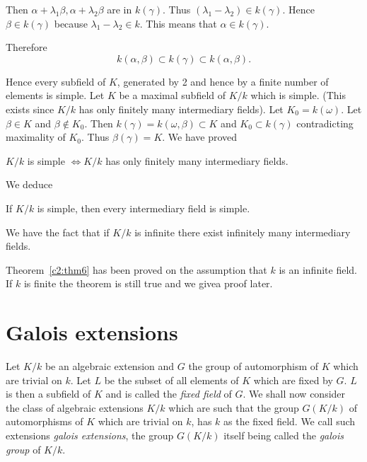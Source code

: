 Then $\alpha + \lambda_1 \beta , \alpha + \lambda_2 \beta$ are in
$k(\gamma)$. Thus $(\lambda_1 - \lambda_2 ) \in k (\gamma)$. Hence
$\beta \in k(\gamma)$ because $\lambda_1 - \lambda_2 \in k$. This
means that $\alpha \in k(\gamma)$. 

Therefore
$$
k(\alpha , \beta) \subset k(\gamma) \subset k (\alpha , \beta).
$$

Hence every subfield of $K$, generated by 2 and hence by a finite
number of elements is simple. Let $K$ be a maximal subfield of $K/k$
which is simple. (This exists since $K/k$ has only finitely many
intermediary fields).  Let $K_0 = k(\omega)$. Let $\beta \in K$ and
$\beta \notin K_0$. Then $k(\gamma) = k(\omega , \beta) \subset K$ and
$K_0 \subset k(\gamma)$ contradicting maximality of $K_0$. Thus
$\beta(\gamma) = K$. We have proved 


\begin{thm}\label{c2:thm6}%
$K/k$ is simple $\Longleftrightarrow K/k$ has only
    finitely many intermediary fields. 
\end{thm}

We deduce
\begin{coro*}
If $K/k$ is simple, then every intermediary field is simple.
\end{coro*}

\begin{Note}%
We have the fact that if $K/k$ is infinite there exist infinitely many
intermediary fields. 
\end{Note}

\begin{Note}%
Theorem~\ref{c2:thm6} has been proved on the assumption that $k$ is
an infinite field. If $k$ is finite the theorem is still true and  we
give\pageoriginale a proof later.  
\end{Note}

\section{Galois extensions}\label{c2:s7}%

Let $K/k$ be an algebraic extension and $G$ the group of automorphism
of $K$ which are trivial on $k$. Let $L$ be the subset of all elements
of $K$ which are fixed by $G$. $L$ is then a subfield of $K$ and is
called the \textit{fixed field} of $G$. We shall now consider the
class of algebraic extensions $K/k$ which are such that the group
$G(K/k)$ of automorphisms of $K$ which are trivial on $k$, has $k$ as
the fixed field. We call such extensions \textit{galois extensions},
the group $G (K/k)$ itself being called the \textit{galois group} of
$K/k$. 

